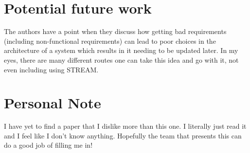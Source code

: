 \documentclass[11pt,twoside]{IEEEtran}
\begin{document}
\section{Potential future work}
The authors have a point when they discuss how getting bad requirements (including non-functional requirements) can lead to poor choices in the architecture of a system which results in it needing to be updated later. In my eyes, there are many different routes one can take this idea and go with it, not even including using STREAM.

\section{Personal Note}
I have yet to find a paper that I dislike more than this one. I literally just read it and I feel like I don't know anything. Hopefully the team that presents this can do a good job of filling me in!
\end{document}
